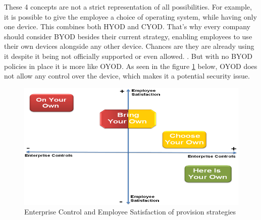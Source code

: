 These 4 concepts are not a strict representation of all possibilities. For example, it is possible to give the employee a choice of operating system, while having only one device. This combines both HYOD and CYOD. That's why every company should consider BYOD besides their current strategy, enabling employees to use their own devices alongside any other device. Chances are they are already using it despite it being not officially supported or even allowed. \parencite{IBMSecurity.2016}. But with no BYOD policies in place it is more like OYOD. As seen in the figure \ref{fig:control_v_satisfaction} below, OYOD does not allow any control over the device, which makes it a potential security issue.
\begin{figure}[H]
	\label{fig:control_v_satisfaction}
	\includegraphics[width=0.7\linewidth]{images/control_v_satisfaction}
	\caption{Enterprise Control and Employee Satisfaction of provision strategies \parencite{KumarGajar.2013}}
\end{figure}

